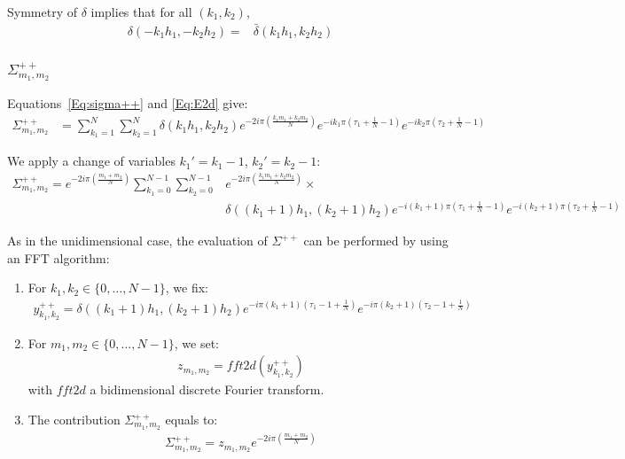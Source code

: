 Symmetry of $\delta$ implies that for all $(k_1, k_2)$,
\begin{align}
\delta\left(-k_1h_1,-k_2h_2\right)=&\bar{\delta}\left(k_1h_1,k_2h_2\right)
\end{align}

\subsubsection{\texorpdfstring{$\Sigma_{m_1,m_2}^{++}$}{sigma++}}

Equations~\eqref{Eq:sigma++} and \eqref{Eq:E2d} give:
\begin{align*}
\Sigma_{m_1,m_2}^{++}&=\sum_{k_1=1}^{N}\sum_{k_2=1}^{N}\delta\left(k_1h_1,k_2h_2\right)
    e^{-2i\pi\left(\frac{k_1m_1+k_2m_2}{N}\right)}
    e^{-ik_1\pi\left(\tau_1+\frac{1}{N}-1\right)}
    e^{-ik_2\pi\left(\tau_2+\frac{1}{N}-1\right)}
\end{align*}

We apply a change of variables $k_1'=k_1-1$, $k_2'=k_2-1$:
\begin{align*}
\Sigma_{m_1,m_2}^{++}=e^{-2i\pi\left(\frac{m_1+m_2}{N}\right)}\sum_{k_1=0}^{N-1}\sum_{k_2=0}^{N-1}
  & e^{-2i\pi\left(\frac{k_1m_1+k_2m_2}{N}\right)} \times\\
  & \delta\left((k_1+1)h_1,(k_2+1)h_2\right)
    e^{-i(k_1+1)\pi\left(\tau_1+\frac{1}{N}-1\right)}
    e^{-i(k_2+1)\pi\left(\tau_2+\frac{1}{N}-1\right)}
\end{align*}

As in the unidimensional case, the evaluation of $\Sigma^{++}$ can be performed by using an FFT algorithm:
\begin{enumerate}
\item For $k_1,k_2\in\{0,\hdots,N-1\}$, we fix:
\begin{align*}
y^{++}_{k_1,k_2}=\delta((k_1+1)h_1,(k_2+1)h_2)e^{-i\pi (k_1+1)\left(\tau_1-1+\frac{1}{N}\right)}e^{-i\pi (k_2+1)\left(\tau_2-1+\frac{1}{N}\right)}
\end{align*}
\item For $m_1,m_2\in\{0,\hdots,N-1\}$, we set:
\begin{align*}
  z_{m_1,m_2}=fft2d(y^{++}_{k_1,k_2})
\end{align*}
with $fft2d$ a bidimensional discrete Fourier transform.
\item The contribution $\Sigma_{m_1,m_2}^{++}$ equals to:
\begin{align*}
  \Sigma_{m_1,m_2}^{++}=z_{m_1,m_2}e^{-2i\pi\left(\frac{m_1+m_2}{N}\right)}
\end{align*}
\end{enumerate}

